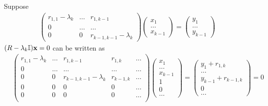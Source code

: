 Suppose
\begin{equation}
\begin{split}
\left(\begin{array}{ccccc}
r_{1,1}-\lambda_k & \ldots & r_{1,k-1} \\
                0 & \ldots & \ldots    \\
                0 &      0 & r_{k-1,k-1}-\lambda _k
\end{array}\right)
\left(\begin{array}{c} x_1 \\ \ldots \\ x_{k-1} \end{array}\right)=\left(\begin{array}{c} y_1 \\ \ldots \\ y_{k-1} \end{array}\right)
\end{split}
\end{equation}
$(R-\lambda _k \mathbb{I}){\bf x} = 0$ can be written as
\begin{equation}
\begin{split}
&\left(\begin{array}{ccccc}
r_{1,1}-\lambda_k & \ldots & r_{1,k-1}   & r_{1,k}   & \ldots \\
      0 & \ldots & \ldots      & \ldots    & \ldots \\
      0 &      0 & r_{k-1,k-1}-\lambda _k & r_{k-1,k} & \ldots \\
      0 &      0 & 0           & 0         & \ldots \\
      0 &      0 & 0           & 0         & \ldots \\
\end{array}\right)
\left(\begin{array}{c} x_1 \\ \ldots \\ x_{k-1} \\ 1 \\ 0 \\ \ldots \end{array}\right)=
\left(\begin{array}{c} y_1+r_{1,k} \\ \ldots \\ y_{k-1}+r_{k-1,k} \\ 0 \\ \ldots \end{array}\right)=0
\end{split}
\end{equation}
